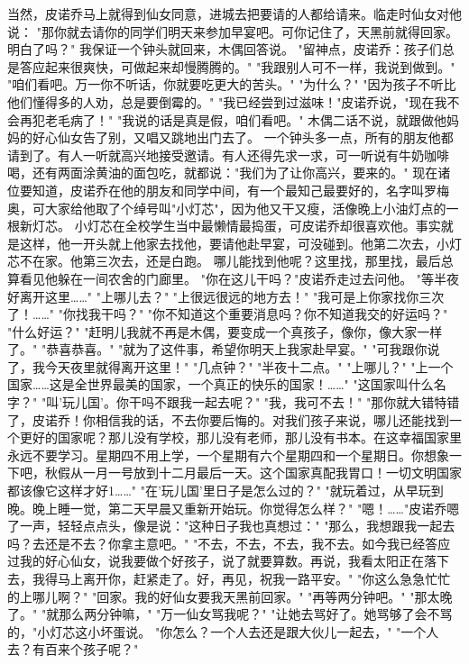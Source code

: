 \documentclass[12pt,UTF8]{ctexbook}
\begin{document}
当然，皮诺乔马上就得到仙女同意，进城去把要请的人都给请来。临走时仙女对他说：
"那你就去请你的同学们明天来参加早宴吧。可你记住了，天黑前就得回家。明白了吗？"
我保证一个钟头就回来，木偶回答说。
"留神点，皮诺乔：孩子们总是答应起来很爽快，可做起来却慢腾腾的。"
"我跟别人可不一样，我说到做到。"
"咱们看吧。万一你不听话，你就要吃更大的苦头。"
"为什么？"
"因为孩子不听比他们懂得多的人劝，总是要倒霉的。"
"我已经尝到过滋味！"皮诺乔说，"现在我不会再犯老毛病了！"
"我说的话是真是假，咱们看吧。"
木偶二话不说，就跟做他妈妈的好心仙女告了别，又唱又跳地出门去了。
一个钟头多一点，所有的朋友他都请到了。有人一听就高兴地接受邀请。有人还得先求一求，可一听说有牛奶咖啡喝，还有两面涂黄油的面包吃，就都说："我们为了让你高兴，要来的。"
现在诸位要知道，皮诺乔在他的朋友和同学中间，有一个最知己最要好的，名字叫罗梅奥，可大家给他取了个绰号叫"小灯芯"，因为他又干又瘦，活像晚上小油灯点的一根新灯芯。
小灯芯在全校学生当中最懒情最捣蛋，可皮诺乔却很喜欢他。事实就是这样，他一开头就上他家去找他，要请他赴早宴，可没碰到。他第二次去，小灯芯不在家。他第三次去，还是白跑。
哪儿能找到他呢？这里找，那里找，最后总算看见他躲在一间农舍的门廊里。
"你在这儿干吗？"皮诺乔走过去问他。
"等半夜好离开这里……"
"上哪儿去？"
"上很远很远的地方去！"
"我可是上你家找你三次了！……"
"你找我干吗？"
"你不知道这个重要消息吗？你不知道我交的好运吗？"
"什么好运？"
"赶明儿我就不再是木偶，要变成一个真孩子，像你，像大家一样了。"
"恭喜恭喜。"
"就为了这件事，希望你明天上我家赴早宴。"
"可我跟你说了，我今天夜里就得离开这里！"
"几点钟？"
"半夜十二点。"
"上哪儿？"
"上一个国家……这是全世界最美的国家，一个真正的快乐的国家！……"
"这国家叫什么名字？"
"叫'玩儿国'。你干吗不跟我一起去呢？"
"我，我可不去！"
"那你就大错特错了，皮诺乔！你相信我的话，不去你要后悔的。对我们孩子来说，哪儿还能找到一个更好的国家呢？那儿没有学校，那儿没有老师，那儿没有书本。在这幸福国家里永远不要学习。星期四不用上学，一个星期有六个星期四和一个星期日。你想象一下吧，秋假从一月一号放到十二月最后一天。这个国家真配我胃口！一切文明国家都该像它这样才好1……"
"在'玩儿国'里日子是怎么过的？"
"就玩着过，从早玩到晚。晚上睡一觉，第二天早晨又重新开始玩。你觉得怎么样？"
"嗯！……"皮诺乔嗯了一声，轻轻点点头，像是说："这种日子我也真想过："
"那么，我想跟我一起去吗？去还是不去？你拿主意吧。"
"不去，不去，不去，我不去。如今我已经答应过我的好心仙女，说我要做个好孩子，说了就要算数。再说，我看太阳正在落下去，我得马上离开你，赶紧走了。好，再见，祝我一路平安。"
"你这么急急忙忙的上哪儿啊？"
"回家。我的好仙女要我天黑前回家。"
"再等两分钟吧。"
"那太晚了。"
"就那么两分钟嘛，"
"万一仙女骂我呢？"
"让她去骂好了。她骂够了会不骂的，"小灯芯这小坏蛋说。
"你怎么？一个人去还是跟大伙儿一起去，"
"一个人去？有百来个孩子呢？"
\end{document}
